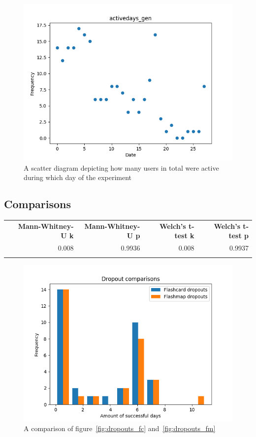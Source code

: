 \begin{figure}
    \includegraphics{img/activedays_gen.png}
    \caption{A scatter diagram depicting how many users in total were active during which day of the experiment}
    \label{fig:activedays_gen}
\end{figure}

\subsection{Comparisons}\label{comparisons}

\begin{longtable}[c]{@{}lrrrr@{}}
\toprule\addlinespace
& \textbf{Mann-Whitney-U k} & \textbf{Mann-Whitney-U p} &
\textbf{Welch's t-test k} & \textbf{Welch's t-test p}
\\\addlinespace
\midrule\endhead
& 0.008 & 0.9936 & 0.008 & 0.9937
\\\addlinespace
\bottomrule
    \label{tab:dropouts-comp}
\end{longtable}

\begin{figure}[htbp]
    \centering
    \includegraphics{img/dropouts.png}
    \caption{A comparison of figure~\protect\ref{fig:dropouts_fc} and~\protect\ref{fig:dropouts_fm}}
    \label{fig:dropouts}
\end{figure}

